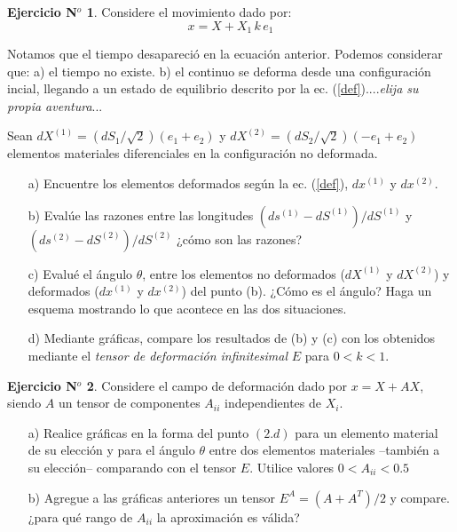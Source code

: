 \documentclass[11pt,a4paper]{article}
\theoremstyle{definition}
\newtheorem{theorem}{Ejercicio N$^o$}
\begin{document}
\begin{theorem}
Considere el movimiento dado por:
\bigskip
\begin{equation} \label{def}
x = X + X_1 \, k \, e_1
\end{equation}

Notamos que el tiempo desapareció en la ecuación anterior. Podemos considerar que: a) el tiempo no existe. b) el continuo se deforma desde una configuración incial,  llegando a un estado de equilibrio descrito por la ec. (\ref{def})....\textit{elija su propia aventura}... 

Sean $dX^{(1)} = (dS_1 / \sqrt{2}) (e_1 + e_2)$ y $dX^{(2)} = (dS_2 / \sqrt{2}) (-e_1 + e_2)$ elementos materiales diferenciales en la configuración no deformada. 

\begin{itemize}
\item[a)] Encuentre los elementos deformados según la ec. (\ref{def}), $dx^{(1)}$ y $dx^{(2)}$.
\item[b)] Evalúe las razones entre las longitudes $(ds^{(1)}-dS^{(1)})/dS^{(1)}$ y \linebreak $(ds^{(2)}-dS^{(2)})/dS^{(2)}$ ¿cómo son las razones?
\item[c)] Evalué el ángulo $\theta$,  entre los elementos no deformados ($dX^{(1)}$ y $dX^{(2)}$) y deformados ($dx^{(1)}$ y $dx^{(2)}$) del punto (b). ¿Cómo es el ángulo? Haga un esquema mostrando lo que acontece en las dos situaciones.
\item[d)] Mediante gráficas, compare los resultados de (b) y (c) con los obtenidos mediante el \textit{tensor de deformación infinitesimal} $E$ para  $0 < k < 1$.
\end{itemize}


\end{theorem}

\pagebreak



\begin{theorem}
 Considere el campo de deformación dado por $x = X + AX$, siendo $A$ un tensor de componentes $A_{ii}$ independientes de $X_i$.
 
\begin{itemize}
\item[a)] Realice gráficas en la forma del punto $(2.d)$ para un elemento material de su elección y para el ángulo $\theta$ entre dos elementos materiales --también a su elección-- comparando con el tensor $E$. Utilice valores $0 < A_{ii} < 0.5$
\item[b)] Agregue a las gráficas anteriores un tensor $E^A = (A+A^T)/2$ y compare. ¿para qué rango de $A_{ii}$ la aproximación es válida?
\end{itemize}

\end{theorem}
\end{document}
